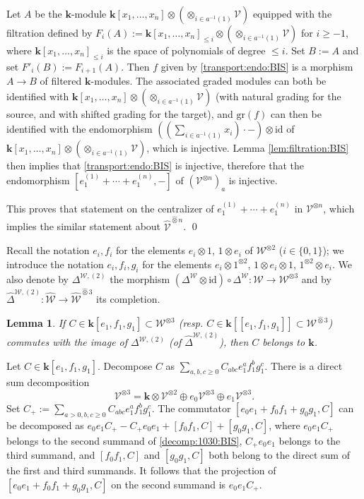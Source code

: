 \documentclass[10pt]{amsart}
\newtheorem{lem}[thm]{Lemma}
\numberwithin{equation}{subsection}
\begin{document}
Let $A$ be the $\mathbf k$-module $\mathbf k[x_1,\ldots,x_n]\otimes(\otimes_{i\in a^{-1}(1)}\mathcal V)$ equipped with the filtration defined by 
$F_i(A):=\mathbf k[x_1,\ldots,x_n]_{\leq i}\otimes(\otimes_{i\in a^{-1}(1)}\mathcal V)$ for $i\geq -1$, where $\mathbf k[x_1,\ldots,x_n]_{\leq i}$ 
is the space of polynomials of degree $\leq i$. Set $B:=A$ and set $F'_i(B):=F_{i+1}(A)$. 
Then $f$ given by \eqref{transport:endo:BIS} is a morphism $A\to B$ of filtered $\mathbf k$-modules. The associated 
graded modules can both be identified with $\mathbf k[x_1,\ldots,x_n]\otimes(\otimes_{i\in a^{-1}(1)}\mathcal V)$ (with natural grading for 
the source, and with shifted grading for the target), and $\mathrm{gr}(f)$ can then be identified with the endomorphism 
$((\sum_{i\in a^{-1}(1)}x_i)\cdot-)\otimes\mathrm{id}$
of $\mathbf k[x_1,\ldots,x_n]\otimes(\otimes_{i\in a^{-1}(1)}\mathcal V)$, which is 
injective. Lemma \ref{lem:filtration:BIS} then implies that \eqref{transport:endo:BIS} is injective, therefore that the 
endomorphism $[e_1^{(1)}+\cdots+e_1^{(n)},-]$ of $(\mathcal V^{\otimes n})_a$ is injective. 

This proves that statement on the centralizer of $e_1^{(1)}+\cdots+e_1^{(n)}$ in $\mathcal V^{\otimes n}$, which implies the similar statement 
about $\hat{\mathcal V}^{\hat\otimes n}$. 
\hfill\qed\medskip 

Recall the notation $e_i,f_i$ for the elements $e_i\otimes1$, $1\otimes e_i$ of $\mathcal W^{\otimes2}$ 
($i\in\{0,1\}$); we introduce the notation $e_i,f_i,g_i$ for the elements $e_i\otimes1^{\otimes2}$, $1\otimes e_i\otimes1$, 
$1^{\otimes2}\otimes e_i$.  We also denote by $\Delta^{\mathcal W,(2)}$ the morphism 
$(\Delta^{\mathcal W}\otimes \mathrm{id})\circ\Delta^{\mathcal W}:\mathcal W\to
\mathcal W^{\otimes3}$ and by $\hat\Delta^{\mathcal W,(2)}:
\hat{\mathcal W}\to\hat{\mathcal W}^{\hat\otimes3}$ its completion.  

\begin{lem}\label{lem:comm:Delta:BIS}
If $C\in\mathbf k[e_1,f_1,g_1]\subset\mathcal W^{\otimes3}$ (resp. 
$C\in\mathbf k[[e_1,f_1,g_1]]\subset\mathcal W^{\hat\otimes3}$) commutes with the image of 
$\Delta^{\mathcal W,(2)}$ (of $\hat\Delta^{\mathcal W,(2)}$), then $C$ belongs to $\mathbf k$. 
\end{lem}

\proof 
Let $C\in\mathbf k[e_1,f_1,g_1]$. 
Decompose $C$ as $\sum_{a,b,c\geq0}C_{abc}e_1^af_1^bg_1^c$. 
There is a direct sum decomposition 
\begin{equation}\label{decomp:1030:BIS}
\mathcal V^{\otimes3}=\mathbf k\otimes\mathcal V^{\otimes2}\oplus e_0\mathcal V^{\otimes3}\oplus
e_1\mathcal V^{\otimes3}. 
\end{equation}
Set $C_+:=\sum_{a>0,b,c\geq0}C_{abc}e_1^af_1^bg_1^c$. The commutator 
$[e_0e_1+f_0f_1+g_0g_1,C]$ can be decomposed as 
$e_0e_1 C_+-C_+e_0e_1+[f_0f_1,C]+[g_0g_1,C]$, 
where $e_0e_1 C_+$ belongs to the second summand of \eqref{decomp:1030:BIS}, 
$C_+e_0e_1$ belongs to the third summand, and $[f_0f_1,C]$ and $[g_0g_1,C]$
both belong to the direct sum of the first and third summands. 
It follows that the projection of $[e_0e_1+f_0f_1+g_0g_1,C]$ on the second summand 
is $e_0e_1 C_+$. 
\end{document}
